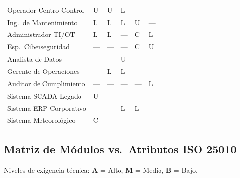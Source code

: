 \documentclass[12pt, letterpaper]{article}
\begin{document}
\begin{longtable}{
  P{3.4cm}
  C{1.8cm}
  C{1.8cm}
  C{1.8cm}
  C{1.8cm}
  C{1.8cm}
}
Operador Centro Control    & U & U & L & ---                  & ---                  \\
Ing.\ de Mantenimiento     & L & L & L & U & ---                  \\
Administrador TI/OT        & L & L & ---                  & C & L \\
Esp.\ Ciberseguridad       & ---                  & ---                  & ---                  & C & U \\
Analista de Datos          & ---                  & ---                  & U & ---                  & ---                  \\
Gerente de Operaciones     & ---                  & L & L & ---                  & ---                  \\
Auditor de Cumplimiento    & ---                  & ---                  & ---                  & ---                  & L \\
Sistema SCADA Legado       & U & ---                  & ---                  & ---                  & ---                  \\
Sistema ERP Corporativo    & ---                  & ---                  & L & L & ---                  \\
Sistema Meteorológico      & C & ---                  & ---                  & ---                  & ---                  \\

\end{longtable}

\subsection{Matriz de Módulos vs.\ Atributos ISO 25010}

Niveles de exigencia técnica: \textbf{A} = Alto, \textbf{M} = Medio, \textbf{B} = Bajo.

\vspace{6pt}
\end{document}
